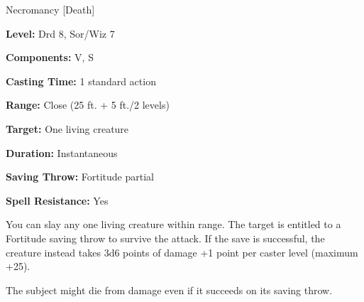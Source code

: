 
Necromancy [Death]

\textbf{Level:} Drd 8, Sor/Wiz 7

\textbf{Components:} V, S

\textbf{Casting Time:} 1 standard action

\textbf{Range:} Close (25 ft. + 5 ft./2 levels)

\textbf{Target:} One living creature

\textbf{Duration:} Instantaneous

\textbf{Saving Throw:} Fortitude partial

\textbf{Spell Resistance:} Yes

You can slay any one living creature within range. The target is entitled to a 
Fortitude saving throw to survive the attack. If the save is successful, the creature 
instead takes 3d6 points of damage +1 point per caster level (maximum +25).

The subject might die from damage even if it succeeds on its saving throw.

